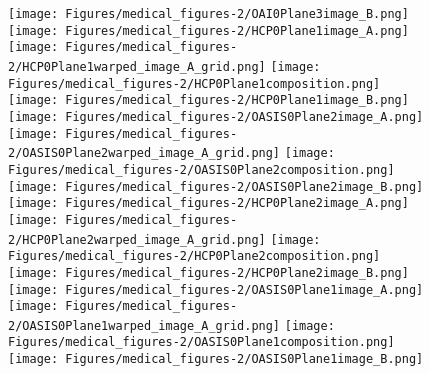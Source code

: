\begin{figure}
{		\texttt{[image: Figures/medical\_figures-2/OAI0Plane3image\_B.png]}
        \\
	 	\texttt{[image: Figures/medical\_figures-2/HCP0Plane1image\_A.png]}
	 	\texttt{[image: Figures/medical\_figures-2/HCP0Plane1warped\_image\_A\_grid.png]}
	 	\texttt{[image: Figures/medical\_figures-2/HCP0Plane1composition.png]}
	 	\texttt{[image: Figures/medical\_figures-2/HCP0Plane1image\_B.png]}
	 	\texttt{[image: Figures/medical\_figures-2/OASIS0Plane2image\_A.png]}
	 	\texttt{[image: Figures/medical\_figures-2/OASIS0Plane2warped\_image\_A\_grid.png]}
	 	\texttt{[image: Figures/medical\_figures-2/OASIS0Plane2composition.png]}
	 	\texttt{[image: Figures/medical\_figures-2/OASIS0Plane2image\_B.png]}
        \\
	 	\texttt{[image: Figures/medical\_figures-2/HCP0Plane2image\_A.png]}
	 	\texttt{[image: Figures/medical\_figures-2/HCP0Plane2warped\_image\_A\_grid.png]}
	 	\texttt{[image: Figures/medical\_figures-2/HCP0Plane2composition.png]}
	 	\texttt{[image: Figures/medical\_figures-2/HCP0Plane2image\_B.png]}
	 	\texttt{[image: Figures/medical\_figures-2/OASIS0Plane1image\_A.png]}
	 	\texttt{[image: Figures/medical\_figures-2/OASIS0Plane1warped\_image\_A\_grid.png]}
	 	\texttt{[image: Figures/medical\_figures-2/OASIS0Plane1composition.png]}
	 	\texttt{[image: Figures/medical\_figures-2/OASIS0Plane1image\_B.png]}
        \\
}
\end{figure}
